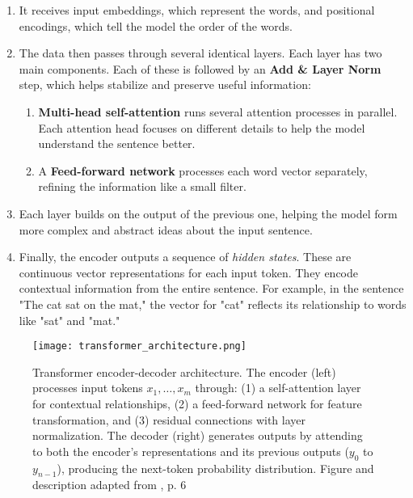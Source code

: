     \begin{enumerate}
        \item It receives input embeddings, which represent the words, and positional encodings, which tell the model the order of the words.
        
        \item The data then passes through several identical layers. Each layer has two main components. Each of these is followed by an \textbf{Add \& Layer Norm} step, which helps stabilize and preserve useful information:
        \begin{enumerate}[label=\alph*.]
            \item \textbf{Multi-head self-attention} runs several attention processes in parallel. Each attention head focuses on different details to help the model understand the sentence better.
            \item A \textbf{Feed-forward network} processes each word vector separately, refining the information like a small filter.
    \end{enumerate}
    
    \item Each layer builds on the output of the previous one, helping the model form more complex and abstract ideas about the input sentence.
    
    \item Finally, the encoder outputs a sequence of \textit{hidden states}. These are continuous vector representations for each input token. They encode contextual information from the entire sentence. For example, in the sentence "The cat sat on the mat," the vector for "cat" reflects its relationship to words like "sat" and "mat."
\end{enumerate}

\begin{figure}[ht]
    \centering
	\texttt{[image: transformer\_architecture.png]}	
        \caption[Transformer encoder-decoder architecture overview]{Transformer encoder-decoder architecture. The encoder (left) processes input tokens \(x_1,\dots,x_m\) through: (1) a self-attention layer for contextual relationships, (2) a feed-forward network for feature transformation, and (3) residual connections with layer normalization. The decoder (right) generates outputs by attending to both the encoder's representations and its previous outputs ($y_0$ to $y_{n-1}$), producing the next-token probability distribution. Figure and description adapted from \textcite{xiaoIntroductionTransformersNLP2023}, p. 6}
    \label{fig:transformer_architecture}
\end{figure}

